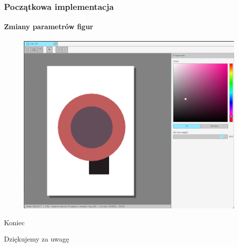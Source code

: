 \documentclass[
	11pt,]{beamer}
\begin{document}
\begin{frame}
	\frametitle{Początkowa implementacja}
	\framesubtitle{Zmiany parametrów figur}
	
	\begin{figure}
		\includegraphics[height=0.7\textheight]{figures/pro9.png}
	\end{figure}
\end{frame}



\begin{frame}[plain] %
	\begin{center}
		{\Huge Koniec}
		
		\bigskip\bigskip %
		
		{\LARGE Dziękujemy za uwagę}
	\end{center}
\end{frame}

\end{document}
